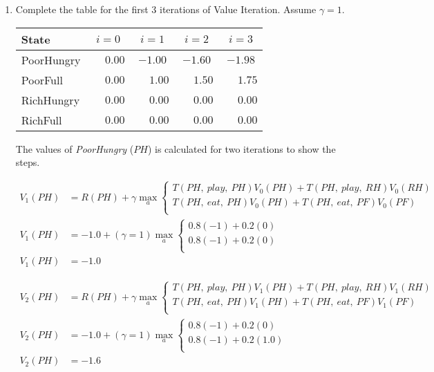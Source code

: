\documentclass[12pt]{article}
\begin{document}
\newpage
\begin{enumerate}

\item Complete the table for the first 3 iterations of Value
  Iteration. Assume $\gamma = 1$.

\begin{center}
\begin{tabular}{|l|c|c|c|c|} \hline
State      & $i=0$ & $i=1$ & $i=2$ & $i=3$ \\ \hline \hline
PoorHungry &$\phantom{-}0.00$&$-1.00$&$-1.60$&$-1.98$\\ \hline
PoorFull   &$\phantom{-}0.00$&$\phantom{-}1.00$&$\phantom{-}1.50$&$\phantom{-}1.75$\\ \hline
RichHungry &$\phantom{-}0.00$&$\phantom{-}0.00$&$\phantom{-}0.00$&$\phantom{-}0.00$\\ \hline
RichFull   &$\phantom{-}0.00$&$\phantom{-}0.00$&$\phantom{-}0.00$&$\phantom{-}0.00$\\ \hline
\end{tabular}
\end{center}

The values of {\em PoorHungry} ($PH$) is calculated for two iterations to show the steps.

\begin{align*}
 V_{1}(PH) &= R(PH) + \gamma\max_{a}\left\{\begin{array}{l}T(PH,\ play,\ PH)V_{0}(PH) + T(PH,\ play,\ RH)V_{0}(RH)\\ T(PH,\ eat,\ PH)V_{0}(PH) + T(PH,\ eat,\ PF)V_{0}(PF)\\\end{array}\right.\\
V_{1}(PH) &= -1.0 + (\gamma = 1)\max_{a}\left\{\begin{array}{l}0.8(-1) + 0.2(0)\\ 0.8(-1) + 0.2(0)\\\end{array}\right.\\
V_{1}(PH) &= -1.0
\end{align*}

\begin{align*}
 V_{2}(PH) &= R(PH) + \gamma\max_{a}\left\{\begin{array}{l}T(PH,\ play,\ PH)V_{1}(PH) + T(PH,\ play,\ RH)V_{1}(RH)\\ T(PH,\ eat,\ PH)V_{1}(PH) + T(PH,\ eat,\ PF)V_{1}(PF)\\\end{array}\right.\\
V_{2}(PH) &= -1.0 + (\gamma = 1)\max_{a}\left\{\begin{array}{l}0.8(-1) + 0.2(0)\\ 0.8(-1) + 0.2(1.0)\\\end{array}\right.\\
V_{2}(PH) &= -1.6
\end{align*}


\end{enumerate}
\end{document}
